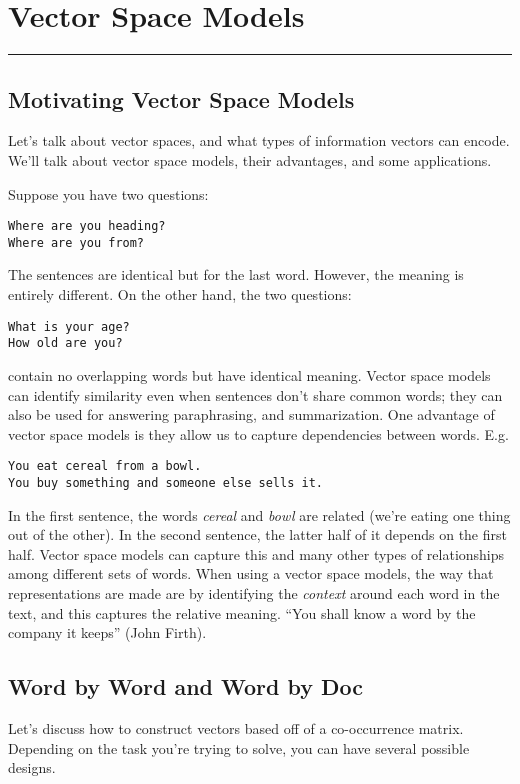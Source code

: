 \documentclass[12pt]{article}
\begin{document}
\section{Vector Space Models}\vspace{.1pt} \hrule height 2pt \smallskip \renewcommand{\arraystretch}{1}%
\subsection{Motivating Vector Space Models}
Let's talk about vector spaces, and what types of information vectors can encode. We'll talk about vector space models, their advantages, and some applications.

Suppose you have two questions:
\begin{verbatim}
Where are you heading?
Where are you from?
\end{verbatim}

The sentences are identical but for the last word. However, the meaning is entirely different. On the other hand, the two questions:
\begin{verbatim}
What is your age?
How old are you?
\end{verbatim}
contain no overlapping words but have identical meaning. Vector space models can identify similarity even when sentences don't share common words; they can also be used for answering paraphrasing, and summarization. One advantage of vector space models is they allow us to capture dependencies between words. E.g.
\begin{verbatim}
You eat cereal from a bowl.
You buy something and someone else sells it.
\end{verbatim}
In the first sentence, the words \emph{cereal} and \emph{bowl} are related (we're eating one thing out of the other). In the second sentence, the latter half of it depends on the first half. Vector space models can capture this and many other types of relationships among different sets of words. When using a vector space models, the way that representations are made are by identifying the \emph{context} around each word in the text, and this captures the relative meaning. ``You shall know a word by the company it keeps'' (John Firth).

\subsection{Word by Word and Word by Doc}
Let's discuss how to construct vectors based off of a co-occurrence matrix. Depending on the task you're trying to solve, you can have several possible designs.
\end{document}
